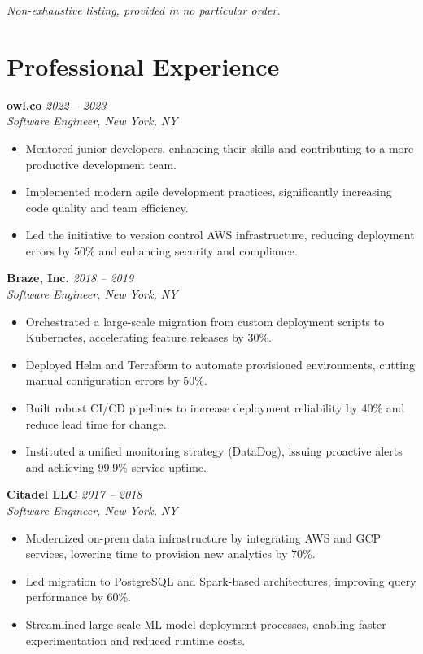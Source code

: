 \documentclass[margin,line]{resume}
\begin{document}
\begin{resume}
\textit{Non-exhaustive listing, provided in no particular order.}

\vspace{10pt}

\section{Professional Experience}

\filbreak
\textbf{owl.co} \hfill \textit{2022 -- 2023}\\
\textit{Software Engineer, New York, NY}

\begin{itemize}
    \item Mentored junior developers, enhancing their skills and contributing to a more productive development team.
    \item Implemented modern agile development practices, significantly increasing code quality and team efficiency.
    \item Led the initiative to version control AWS infrastructure, reducing deployment errors by 50\% and enhancing security and compliance.
\end{itemize}

\filbreak
\textbf{Braze, Inc.} \hfill \textit{2018 -- 2019}\\
\textit{Software Engineer, New York, NY}

\begin{itemize}
    \item Orchestrated a large-scale migration from custom deployment scripts to Kubernetes, accelerating feature releases by 30\%.
    \item Deployed Helm and Terraform to automate provisioned environments, cutting manual configuration errors by 50\%.
    \item Built robust CI/CD pipelines to increase deployment reliability by 40\% and reduce lead time for change.
    \item Instituted a unified monitoring strategy (DataDog), issuing proactive alerts and achieving 99.9\% service uptime.
\end{itemize}

\filbreak
\textbf{Citadel LLC} \hfill \textit{2017 -- 2018}\\
\textit{Software Engineer, New York, NY}

\begin{itemize}
    \item Modernized on-prem data infrastructure by integrating AWS and GCP services, lowering time to provision new analytics by 70\%.
    \item Led migration to PostgreSQL and Spark-based architectures, improving query performance by 60\%.
    \item Streamlined large-scale ML model deployment processes, enabling faster experimentation and reduced runtime costs.
\end{itemize}


\end{resume}
\end{document}
